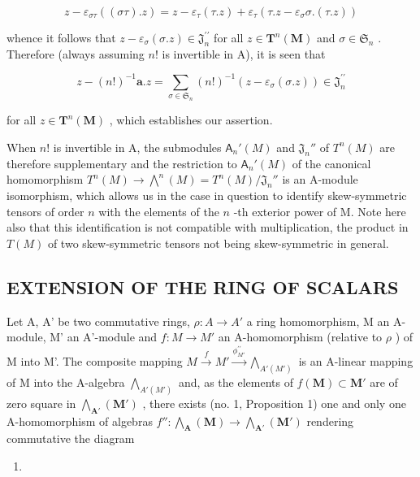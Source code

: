 \[
z - \varepsilon_ {\sigma \tau} ((\sigma \tau). z) = z - \varepsilon_ {\tau} (\tau . z) + \varepsilon_ {\tau} (\tau . z - \varepsilon_ {\sigma} \sigma . (\tau . z))
\]

whence it follows that \(z - \varepsilon_{\sigma}(\sigma . z) \in \mathfrak{J}_{n}^{\prime \prime}\) for all \(z \in \mathbf{T}^{n}(\mathbf{M})\) and \(\sigma \in \mathfrak{S}_{n}\) . Therefore (always assuming \(n!\) is invertible in A), it is seen that

\[
z - (n!) ^ {- 1} \boldsymbol {a}. z = \sum_ {\sigma \in \mathfrak {S} _ {n}} (n!) ^ {- 1} (z - \varepsilon_ {\sigma} (\sigma . z)) \in \mathfrak {J} _ {n} ^ {\prime \prime}
\]

for all \(z \in \mathbf{T}^n(\mathbf{M})\) , which establishes our assertion.

When \(n!\) is invertible in A, the submodules \(\mathsf{A}_n'(M)\) and \(\mathfrak{J}_n''\) of \(T^n(M)\) are therefore supplementary and the restriction to \(\mathsf{A}_n'(M)\) of the canonical homomorphism \(T^n(M) \to \bigwedge^n(M) = T^n(M)/\mathfrak{J}_n''\) is an A-module isomorphism, which allows us in the case in question to identify skew-symmetric tensors of order \(n\) with the elements of the \(n\) -th exterior power of M. Note here also that this identification is not compatible with multiplication, the product in \(T(M)\) of two skew-symmetric tensors not being skew-symmetric in general.

\subsection{EXTENSION OF THE RING OF SCALARS}

Let A, A' be two commutative rings, \(\rho:A\to A'\) a ring homomorphism, M an A-module, M' an A'-module and \(f:M\to M'\) an A-homomorphism (relative to \(\rho\) ) of M into M'. The composite mapping \(M\xrightarrow{f}M'\xrightarrow{\phi_{M'}^{\prime\prime}}\bigwedge_{A'(M')}\) is an A-linear mapping of M into the A-algebra \(\bigwedge_{A'(M')}\) and, as the elements of \(f(\mathbf{M}) \subset \mathbf{M}'\) are of zero square in \(\bigwedge_{\mathbf{A}'}(\mathbf{M}')\) , there exists (no. 1, Proposition 1) one and only one A-homomorphism of algebras \(f'': \bigwedge_{\mathbf{A}}(\mathbf{M}) \to \bigwedge_{\mathbf{A}'}(\mathbf{M}')\) rendering commutative the diagram

\begin{enumerate}
\def\labelenumi{(\arabic{enumi})}
\setcounter{enumi}{11}
\tightlist
\item
\end{enumerate}


